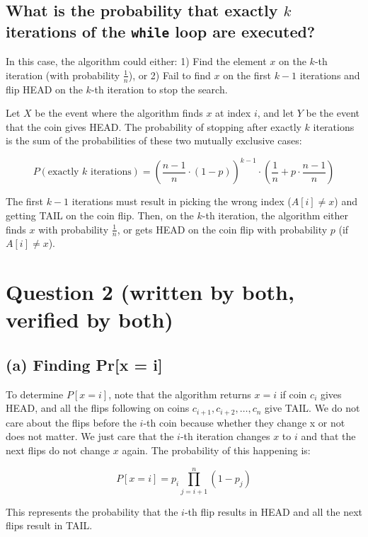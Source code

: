 \documentclass{article}
\begin{document}
\subsection*{What is the probability that exactly \(k\) iterations of the \texttt{while} loop are executed?}

In this case, the algorithm could either:
1) Find the element \(x\) on the \(k\)-th iteration (with probability \( \frac{1}{n} \)), or
2) Fail to find \(x\) on the first \(k-1\) iterations and flip HEAD on the \(k\)-th iteration to stop the search.

Let \(X\) be the event where the algorithm finds \(x\) at index \(i\), and let \(Y\) be the event that the coin gives HEAD. The probability of stopping after exactly \(k\) iterations is the sum of the probabilities of these two mutually exclusive cases:

\[
P(\text{exactly } k \text{ iterations}) = \left( \frac{n-1}{n} \cdot (1 - p) \right)^{k-1} \cdot \left( \frac{1}{n} + p \cdot \frac{n-1}{n} \right)
\]

The first \(k-1\) iterations must result in picking the wrong index (\(A[i] \neq x\)) and getting TAIL on the coin flip. Then, on the \(k\)-th iteration, the algorithm either finds \(x\) with probability \( \frac{1}{n} \), or gets HEAD on the coin flip with probability \(p\) (if \(A[i] \neq x\)).

\newpage

\section*{Question 2  (written by both, verified by both)}

\subsection*{(a) Finding Pr[x = i]}
To determine \( P[x = i] \), note that the algorithm returns \(x = i\) if coin \(c_i\) gives HEAD, and all the flips following on coins \(c_{i+1}, c_{i+2}, \ldots, c_n\) give TAIL. We do not care about the flips before the \(i\)-th coin because whether they change x or not does not matter. We just care that the \(i\)-th iteration changes \(x\)  to \(i\) and that the next flips do not change \(x\)  again. The probability of this happening is:

\[
P[x = i] = p_i \prod_{j=i + 1}^{n} (1 - p_j)
\]

This represents the probability that the \(i\)-th flip results in HEAD and all the next flips result in TAIL.
\end{document}
